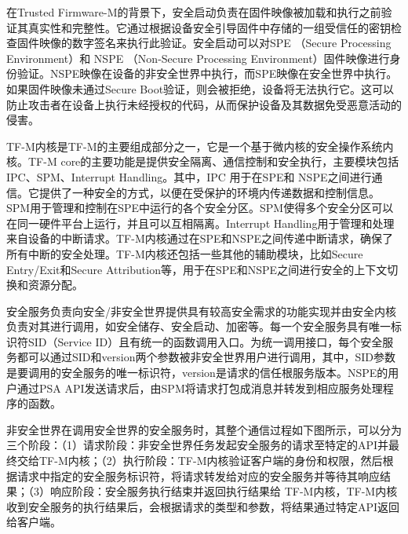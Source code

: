 \documentclass[12pt,a4paper]{ctexart}
\begin{document}
\par 在Trusted Firmware-M的背景下，安全启动负责在固件映像被加载和执行之前验证其真实性和完整性。它通过根据设备安全引导固件中存储的一组受信任的密钥检查固件映像的数字签名来执行此验证。安全启动可以对SPE （Secure Processing Environment）和 NSPE （Non-Secure Processing Environment）固件映像进行身份验证。NSPE映像在设备的非安全世界中执行，而SPE映像在安全世界中执行。如果固件映像未通过Secure Boot验证，则会被拒绝，设备将无法执行它。这可以防止攻击者在设备上执行未经授权的代码，从而保护设备及其数据免受恶意活动的侵害。
\par TF-M内核是TF-M的主要组成部分之一，它是一个基于微内核的安全操作系统内核。TF-M core的主要功能是提供安全隔离、通信控制和安全执行，主要模块包括IPC、SPM、Interrupt Handling。其中，IPC 用于在SPE和 NSPE之间进行通信。它提供了一种安全的方式，以便在受保护的环境内传递数据和控制信息。SPM用于管理和控制在SPE中运行的各个安全分区。SPM使得多个安全分区可以在同一硬件平台上运行，并且可以互相隔离。Interrupt Handling用于管理和处理来自设备的中断请求。TF-M内核通过在SPE和NSPE之间传递中断请求，确保了所有中断的安全处理。TF-M内核还包括一些其他的辅助模块，比如Secure Entry/Exit和Secure Attribution等，用于在SPE和NSPE之间进行安全的上下文切换和资源分配。
\par 安全服务负责向安全/非安全世界提供具有较高安全需求的功能实现并由安全内核负责对其进行调用，如安全储存、安全启动、加密等。每一个安全服务具有唯一标识符SID（Service ID）且有统一的函数调用入口。为统一调用接口，每个安全服务都可以通过SID和version两个参数被非安全世界用户进行调用，其中，SID参数是要调用的安全服务的唯一标识符，version是请求的信任根服务版本。NSPE的用户通过PSA API发送请求后，由SPM将请求打包成消息并转发到相应服务处理程序的函数。
\par 非安全世界在调用安全世界的安全服务时，其整个通信过程如下图所示，可以分为三个阶段：（1）请求阶段：非安全世界任务发起安全服务的请求至特定的API并最终交给TF-M内核；（2）执行阶段：TF-M内核验证客户端的身份和权限，然后根据请求中指定的安全服务标识符，将请求转发给对应的安全服务并等待其响应结果；（3）响应阶段：安全服务执行结束并返回执行结果给 TF-M内核，TF-M内核收到安全服务的执行结果后，会根据请求的类型和参数，将结果通过特定API返回给客户端。\\
\end{document}

